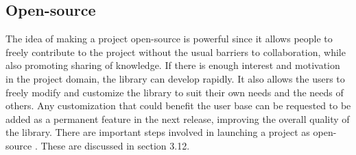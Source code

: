 \begin{specification}
\subsection{Open-source}
The idea of making a project open-source is powerful since it allows people to freely contribute to the project without the usual barriers to collaboration, while also promoting sharing of knowledge. If there is enough interest and motivation in the project domain, the library can develop rapidly. It also allows the users to freely modify and customize the library to suit their own needs and the needs of others. Any customization that could benefit the user base can be requested to be added as a permanent feature in the next release, improving the overall quality of the library. There are important steps involved in launching a project as open-source \cite{open_source}. These are discussed in section 3.12.
\end{specification}
\vspace{1cm}
\clearpage